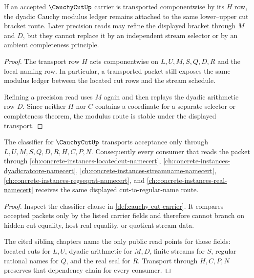\begin{theorem}
\label{thm:cauchy-cut-modulus-stability}
If an accepted $\CauchyCutUp$ carrier is transported componentwise by its $H$ row, the dyadic Cauchy modulus ledger remains attached to the same lower--upper cut bracket route. Later precision reads may refine the displayed bracket through $M$ and $D$, but they cannot replace it by an independent stream selector or by an ambient completeness principle.
\end{theorem}
\begin{proof}
The transport row $H$ acts componentwise on $L,U,M,S,Q,D,R$ and the local naming row. In particular, a transported packet still exposes the same modulus ledger between the located cut rows and the stream schedule.

Refining a precision read uses $M$ again and then replays the dyadic arithmetic row $D$. Since neither $H$ nor $C$ contains a coordinate for a separate selector or completeness theorem, the modulus route is stable under the displayed transport.
\end{proof}

\begin{theorem}
\label{thm:cauchy-cut-classifier-transport}
The classifier for $\CauchyCutUp$ transports acceptance only through $L,U,M,S,Q,D,R,H,C,P,N$. Consequently every consumer that reads the packet through \autoref{ch:concrete-instances-locatedcut-namecert}, \autoref{ch:concrete-instances-dyadicratcore-namecert}, \autoref{ch:concrete-instances-streamname-namecert}, \autoref{ch:concrete-instances-regseqrat-namecert}, and \autoref{ch:concrete-instances-real-namecert} receives the same displayed cut-to-regular-name route.
\end{theorem}
\begin{proof}
Inspect the classifier clause in \autoref{def:cauchy-cut-carrier}. It compares accepted packets only by the listed carrier fields and therefore cannot branch on hidden cut equality, host real equality, or quotient stream data.

The cited sibling chapters name the only public read points for those fields: located cuts for $L,U$, dyadic arithmetic for $M,D$, finite streams for $S$, regular rational names for $Q$, and the real seal for $R$. Transport through $H,C,P,N$ preserves that dependency chain for every consumer.
\end{proof}

